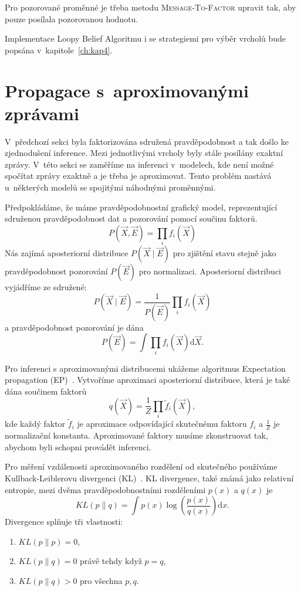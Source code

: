 Pro pozorované proměnné je třeba metodu \textsc{Message-To-Factor} upravit tak, aby pouze posílala pozorovanou hodnotu.

Implementace Loopy Belief Algoritmu i se strategiemi pro výběr vrcholů bude popsána v~kapitole~\ref{ch:kap4}.

\section{Propagace s~aproximovanými zprávami}

V~předchozí sekci byla faktorizována sdružená pravděpodobnost a tak došlo ke zjednodušení inference.
Mezi jednotlivými vrcholy byly stále posílány exaktní zprávy.
V~této sekci se zaměříme na inferenci v~modelech, kde není možné spočítat zprávy exaktně a je třeba je aproximovat.
Tento problém nastává u~některých modelů se spojitými náhodnými proměnnými.

Předpokládáme, že máme pravděpodobnostní grafický model, reprezentující sdruženou pravděpodobnost dat a pozorování pomocí součinu faktorů.
\begin{equation}
P(\vec{X}, \vec{E}) = \prod_i f_i(\vec{X})
\end{equation}
Nás zajímá aposteriorní distribuce $P(\vec{X} \mid \vec{E})$ pro zjištění stavu stejně jako pravděpodobnost pozorování $P(\vec{E})$ pro normalizaci.
Aposteriorní distribuci vyjádříme ze sdružené:
\begin{equation}
P(\vec{X} \mid \vec{E}) = \frac{1}{P(\vec{E})} \prod_i f_i(\vec{X})
\end{equation}
a pravděpodobnost pozorování je dána
\begin{equation}
P(\vec{E}) = \int \prod_i f_i(\vec{X}) \mathrm{d}\vec{X}.
\end{equation}

Pro inferenci s aproximovanými distribucemi ukážeme algoritmus Expectation propagation (EP)~\cite{minka2001expectation}.
Vytvoříme aproximaci aposteriorní distribuce, která je také dána součinem faktorů
\begin{equation}
q(\vec{X}) = \frac{1}{Z} \prod_i \tilde{f}_i(\vec{X}),
\end{equation}
kde každý faktor $\tilde{f}_i$ je aproximace odpovídající skutečnému faktoru $f_i$ a $\frac{1}{Z}$ je normalizační konstanta.
Aproximované faktory musíme zkonstruovat tak, abychom byli schopni provádět inferenci.

Pro měření vzdálenosti aproximovaného rozdělení od skutečného používáme Kullback-Leiblerovu divergenci (KL)~\cite{kullback1997information}.
KL divergence, také známá jako relativní entropie, mezi dvěma pravděpodobnostními rozděleními $p(x)$ a $q(x)$ je
\begin{equation}
KL(p \| q) = \int p(x) \log \left(\frac{p(x)}{q(x)}\right) \mathrm{d}x.
\end{equation}
Divergence splňuje tři vlastnosti:
\begin{enumerate}
\item $KL(p \| p) = 0$,
\item $KL(p \| q) = 0$ právě tehdy když $p = q$,
\item $KL(p \| q) > 0$ pro všechna $p, q$.
\end{enumerate}


